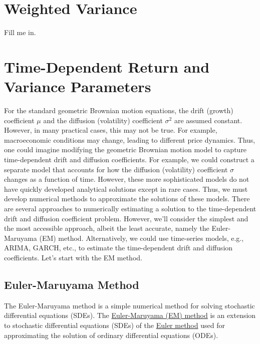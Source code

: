 \documentclass[11pt]{article}
\theoremstyle{definition}
\begin{document}
\section*{Weighted Variance}
Fill me in.

\section*{Time-Dependent Return and Variance Parameters}
For the standard geometric Brownian motion equations, the drift (growth) coefficient $\mu$ and the diffusion (volatility) coefficient $\sigma^{2}$ are assumed constant. 
However, in many practical cases, this may not be true. For example, macroeconomic conditions may change, leading to different price dynamics. 
Thus, one could imagine modifying the geometric Brownian motion model to capture time-dependent drift and diffusion coefficients.
For example, we could construct a separate model that accounts for how the diffusion (volatility) coefficient $\sigma$ 
changes as a function of time. However, these more sophisticated models do not have quickly developed analytical solutions except in rare cases. 
Thus, we must develop numerical methods to approximate the solutions of these models. There are several approaches to numerically estimating a solution to the time-dependent drift and diffusion coefficient problem.
However, we'll consider the simplest and the most accessible approach, albeit the least accurate, 
namely the Euler-Maruyama (EM) method. 
Alternatively, we could use time-series models, e.g., ARIMA, GARCH, etc., to estimate the time-dependent drift and diffusion coefficients.
Let's start with the EM method.

\subsection*{Euler-Maruyama Method}
The Euler-Maruyama method is a simple numerical method for solving stochastic differential equations (SDEs). 
The \href{https://en.wikipedia.org/wiki/Euler–Maruyama_method}{Euler-Maruyama (EM) method}
is an extension to stochastic differential equations (SDEs) of the \href{https://en.wikipedia.org/wiki/Euler_method}{Euler method}
used for approximating the solution of ordinary differential equations (ODEs). 
\end{document}
